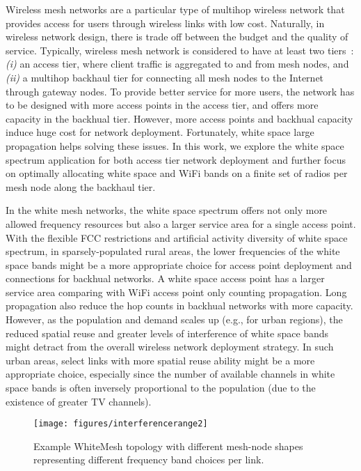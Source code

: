 Wireless mesh networks are a particular type of multihop wireless network that provides access 
for users through wireless links with low cost. Naturally, in wireless network design, there is 
trade off between the budget and the quality of service. Typically, wireless mesh network is 
considered to have at least two tiers~\cite{CRSK06}: {\it (i)} an access tier, where client 
traffic is aggregated to and from mesh nodes, and {\it (ii)} a multihop backhaul tier for 
connecting all mesh nodes to the Internet through gateway nodes. To provide better service for 
more users, the network has to be designed with more access points in the access tier, and 
offers more capacity in the backhual tier. However, more access points and backhual capacity 
induce huge cost for network deployment. Fortunately, white space large propagation helps solving 
these issues. In this work, we explore the white space spectrum application for both access tier 
network deployment and further focus on optimally allocating white space and WiFi bands on a 
finite set of radios per mesh node along the backhaul tier.  

In the white mesh networks, the white space spectrum offers not only more allowed frequency resources
but also a larger service area for a single access point. With the flexible FCC restrictions and 
artificial activity diversity of white space spectrum, in sparsely-populated rural areas, the 
lower frequencies of the white space bands might be a more appropriate choice for access point 
deployment and connections for backhual networks. A white space access point has a larger service
area comparing with WiFi access point only counting propagation. Long propagation also reduce the 
hop counts in backhual networks with more capacity.  
However, as the population and demand scales up (e.g., for urban regions), the reduced spatial 
reuse and greater levels of interference of white space bands might detract from the overall wireless
network deployment strategy. In such urban areas, select links with more spatial reuse ability might
be a more appropriate choice, especially since the number of available channels in white space bands 
is often inversely proportional to the population (due to the existence of greater TV channels).




\begin{figure}
\vspace{-0.0in}
\centering
\texttt{[image: figures/interferencerange2]}
\vspace{-0.1in}
\caption{Example WhiteMesh topology with different mesh-node shapes 
representing different frequency band choices per link.}
\label{fig:interferencerange}
\vspace{-0.2in}
\end{figure}


